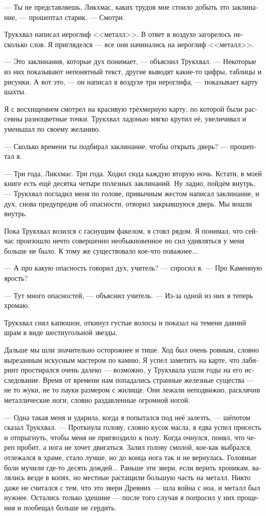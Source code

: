 \documentclass[a4paper,12pt,fleqn]{book}\usepackage{cooltooltips}\usepackage{polyglossia}\setdefaultlanguage[babelshorthands=true]{russian}\setotherlanguage{english}\defaultfontfeatures{Ligatures=TeX,Mapping=tex-text} \usepackage{xcolor}\definecolor{lightgray}{HTML}{bbbbbb}\color{lightgray}\newcommand{\ml}[3]{\textenglish{\textcolor{black}{#3}}}
\newcommand{\asterism}{\vspace{1em}{\centering\Large\bfseries$\ast~\ast~\ast$\par}\vspace{1em}}
\begin{document}
{--- Ты не представляешь, Ликхмас, каких трудов мне стоило добыть это заклинание, --- прошептал старик.
--- Смотри.

Трукхвал написал иероглиф <<металл>>.
В ответ в воздухе загорелось несколько слов.
Я пригляделся --- все они начинались на иероглиф <<металл>>.

--- Это заклинания, которые дух понимает, --- объяснил Трукхвал.
--- Некоторые из них показывают непонятный текст, другие выводят какие-то цифры, таблицы и рисунки.
А вот это, --- он написал в воздухе три иероглифа, --- показывает карту шахты.

Я с восхищением смотрел на красивую трёхмерную карту, по которой были рассеяны разноцветные точки.
Трукхвал ладонью мягко крутил её, увеличивал и уменьшал по своему желанию.

--- Сколько времени ты подбирал заклинание, чтобы открыть дверь? --- прошептал я.

--- Три года, Ликхмас.
Три года.
Ходил сюда каждую вторую ночь.
Кстати, в моей книге есть ещё десятка четыре полезных заклинаний.
Ну ладно, пойдём внутрь, --- Трукхвал погладил меня по голове, привычным жестом написал заклинание, и дух, снова предупредив об опасности, отворил закрывшуюся дверь.
Мы вошли внутрь.

Пока Трукхвал возился с гаснущим факелом, я стоял рядом.
Я понимал, что сейчас произошло нечто совершенно необыкновенное но сил удивляться у меня больше не было.
К тому же существовало кое-что поважнее...

--- А про какую опасность говорил дух, учитель? --- спросил я.
--- Про Каменную ярость?

--- Тут много опасностей, --- объяснил учитель.
--- Из-за одной из них я теперь хромаю.

Трукхвал снял капюшон, откинул густые волосы и показал на темени давний шрам в виде шестиугольной звезды.

\asterism

Дальше мы шли значительно осторожнее и тише.
Ход был очень ровным, словно вырезанным искусным мастером по камню.
Я успел заметить на карте, что лабиринт простирался очень далеко --- возможно, у Трукхвала ушли годы на его исследование.
Время от времени нам попадались странные железные существа --- не то жуки, не то пауки размером с жилище.
Они лежали неподвижно, расклячив металлические ноги, словно раздавленные огромной ногой.

--- Одна такая меня и ударила, когда я попытался под неё залезть, --- шёпотом сказал Трукхвал.
--- Проткнула голову, словно кусок масла, я едва успел присесть и отпрыгнуть, чтобы меня не пригвоздило к полу.
Когда очнулся, понял, что череп пробит, а нога не хочет двигаться.
Залил голову смолой, кое-как выбрался, отлежался в храме, стало лучше, но до конца нога так и не вернулась.
Головные боли мучили где-то десять дождей...
Раньше эти звери, если верить хроникам, валялись везде в копях, но местные растащили большую часть на металл.
Никто даже не считался с тем, что это звери Древних --- шла война с ноа, и металл был нужнее.
Остались только здешние --- после того случая я попросил у них прощения и пообещал больше не сердить.

}
\end{document}

